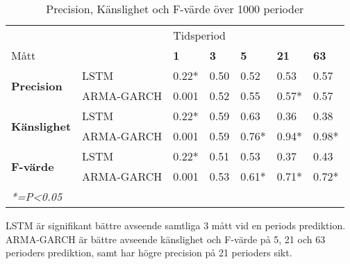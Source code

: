 \documentclass[12pt]{article}
\begin{document}
\begin{table}[H]
\caption{Precision, Känslighet och F-värde över 1000 perioder}
\begin{tabular}{||lllllll||}
\hline
                                     &            & \multicolumn{5}{l||}{Tidsperiod}                                  \\
Mått                                 &            & \textbf{1} & \textbf{3} & \textbf{5} & \textbf{21} & \textbf{63} \\ \hline\hline
\multirow{2}{*}{\textbf{Precision}} & LSTM       & 0.22*          & 0.50       & 0.52       & 0.53        & 0.57        \\
                                     & ARMA-GARCH & 0.001          & 0.52       & 0.55       & 0.57*        & 0.57        \\ \cline{2-7} 
\multirow{2}{*}{\textbf{Känslighet}}  & LSTM       & 0.22*          & 0.59          & 0.63          & 0.36           & 0.38      \\
                                     & ARMA-GARCH & 0.001          & 0.59          & 0.76*          & 0.94*           & 0.98*           \\ \cline{2-7} 
\multirow{2}{*}{\textbf{F-värde}}    & LSTM       & 0.22*          & 0.51        & 0.53       & 0.37       & 0.43        \\
                                     & ARMA-GARCH & 0.001          & 0.53        & 0.61*       & 0.71*       & 0.72*        \\ \hline
\multicolumn{5}{l}{\textit{*=P\textless{}0.05}}
\end{tabular}
\end{table}

LSTM är signifikant bättre avseende samtliga 3 mått vid en periods prediktion. ARMA-GARCH är bättre avseende känslighet och F-värde på 5, 21 och 63 perioders prediktion, samt har högre precision på 21 perioders sikt.
\end{document}
